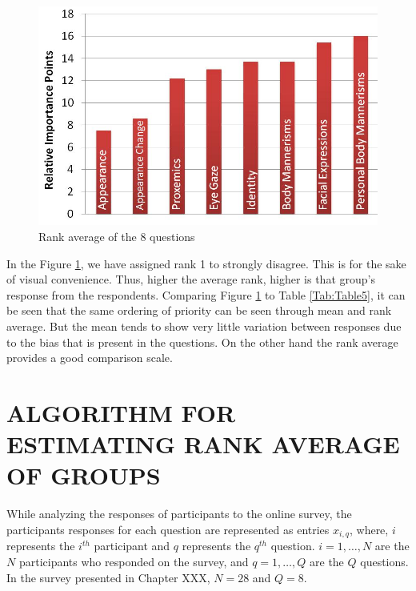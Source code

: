 \documentclass[oneside,11pt]{memoir}
\begin{document}
\begin{figure}
\includegraphics[width=5in]{rankaverage.jpg}
\caption{Rank average of the 8 questions}
\label{Fig:Figure8}
\end{figure}


In the Figure \ref{Fig:Figure8}, we have assigned rank 1 to strongly disagree. This is for the sake of visual convenience. Thus, higher the average rank, higher is that group's response from the respondents. Comparing Figure \ref{Fig:Figure8} to Table \ref{Tab:Table5}, it can be seen that the same ordering of priority can be seen through mean and rank average. But the mean tends to show very little variation between responses due to the bias that is present in the questions. On the other hand the rank average provides a good comparison scale.




\vspace*{1in}
\begin{SingleSpace}
	

\end{SingleSpace}


\appendix
{}
\chapter{\uppercase{Algorithm for Estimating Rank Average of Groups}}
\label{AppendixA}
\clearpage
While analyzing the responses of participants to the online survey, the participants responses for each question are represented as entries $x_{i,q}$, where, $i$ represents the $i^{th}$ participant and $q$ represents the $q^{th}$ question. $i = 1,\ldots,N$ are the $N$ participants who responded on the survey, and $q = 1, \ldots, Q$ are the $Q$ questions. In the survey presented in Chapter XXX, $N = 28$ and $Q = 8$.
\end{document}
